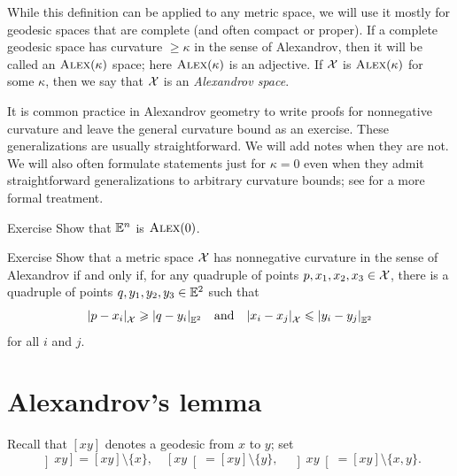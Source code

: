 While this definition can be applied to any metric space,
we will use it mostly for geodesic spaces that are complete (and often compact or proper). 
If a complete geodesic space has curvature $\ge\kappa$ in the sense of Alexandrov, 
then it will be called an $\textup{\textsc{Alex}}(\kappa)$ space; here $\textup{\textsc{Alex}}(\kappa)$ is an adjective.
If $\mathcal{X}$ is $\textup{\textsc{Alex}}(\kappa)$ for some $\kappa$, then we say that $\mathcal{X}$ is an \emph{Alexandrov space}.

It is common practice in Alexandrov geometry to write proofs for nonnegative curvature and 
leave the general curvature bound as an exercise. These generalizations are usually straightforward. We will add notes when they are not.
We will also often formulate statements just for $\kappa=0$ even when they admit straightforward generalizations to arbitrary curvature bounds;
see \cite{alexander-kapovitch-petrunin2024} for a more formal treatment.

\begin{thm}{Exercise}\label{ex:Euclid-is-CBB}
Show that $\mathbb{E}^n$ is $\textup{\textsc{Alex}}(0)$.
\end{thm}

\begin{thm}{Exercise}\label{ex:(3+1)-expanding}
Show that a metric space $\mathcal{X}$ has nonnegative curvature in the sense of Alexandrov
if and only if, for any quadruple of points $p,x_1,x_2,x_3\in \mathcal{X}$,
there is a quadruple of points $q,y_1,y_2,y_3\in\mathbb{E}^2$
such that 
\[\dist{p}{x_i}{\spc{X}}\ge\dist{q}{y_i}{\EE^2} 
\quad \text{and}\quad
\dist{x_i}{x_j}{\spc{X}}\le\dist{y_i}{y_j}{\EE^2}\] 
for all $i$ and $j$.
\end{thm}

\section{Alexandrov's lemma}

Recall that $[xy]$ denotes a geodesic from $x$ to $y$;
set
\index{10@$\left]x y\right]$, $\left[x y\right[$, $\left]x y\right[$ (subintervals)}
\[
\left]x y\right]=[xy]\setminus\{x\},
\quad
\left[x y\right[=[xy]\setminus\{y\},
\quad
\left]x y\right[=[xy]\setminus\{x,y\}.\]

